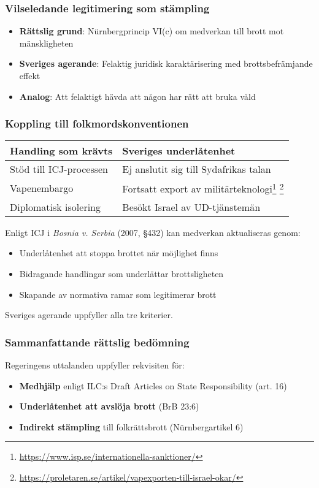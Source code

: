 \subsubsection{Vilseledande legitimering som stämpling}
\begin{itemize}
\item \textbf{Rättslig grund}: Nürnbergprincip VI(c) om medverkan till brott mot mänskligheten
\item \textbf{Sveriges agerande}: Felaktig juridisk karaktärisering med brottsbefrämjande effekt
\item \textbf{Analog}: Att felaktigt hävda att någon har rätt att bruka våld
\end{itemize}

\subsubsection{Koppling till folkmordskonventionen}

\begin{tabular}{p{}p{}}
\textbf{Handling som krävts} & \textbf{Sveriges underlåtenhet} \\
\hline
Stöd till ICJ-processen & Ej anslutit sig till Sydafrikas talan \\
\hline
Vapenembargo & Fortsatt export av militärteknologi\footnote{\url{https://www.isp.se/internationella-sanktioner/}} \footnote{\url{https://proletaren.se/artikel/vapexporten-till-israel-okar/}} \\
\hline
Diplomatisk isolering & Besökt Israel av UD-tjänstemän \\
\end{tabular}



Enligt ICJ i \textit{Bosnia v. Serbia} (2007, §432) kan medverkan aktualiseras genom:
\begin{itemize}
\item Underlåtenhet att stoppa brottet när möjlighet finns
\item Bidragande handlingar som underlättar brottsligheten
\item Skapande av normativa ramar som legitimerar brott
\end{itemize}
Sveriges agerande uppfyller alla tre kriterier.



\subsubsection{Sammanfattande rättslig bedömning}
Regeringens uttalanden uppfyller rekvisiten för:
\begin{itemize}
\item \textbf{Medhjälp} enligt ILC:s Draft Articles on State Responsibility (art. 16)
\item \textbf{Underlåtenhet att avslöja brott} (BrB 23:6)
\item \textbf{Indirekt stämpling} till folkrättsbrott (Nürnbergartikel 6)
\end{itemize}

